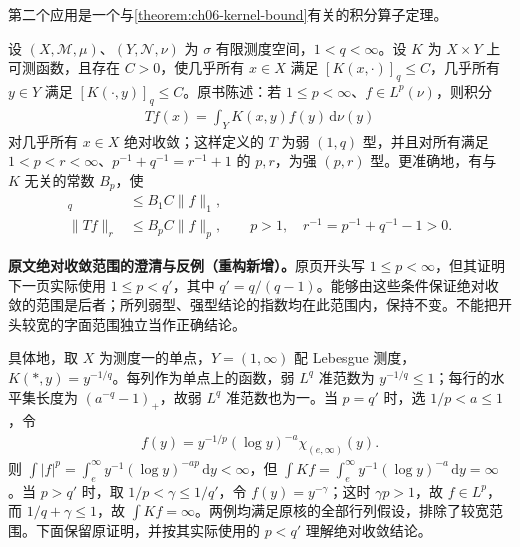 \documentclass[../../main.tex]{subfiles}
\begin{document}
第二个应用是一个与\cref{theorem:ch06-kernel-bound}有关的积分算子定理。
\begin{theorem}\label{theorem:ch06-weak-kernel}
设 $(X,\mathscr M,\mu)$、$(Y,\mathscr N,\nu)$ 为 $\sigma$ 有限测度空间，$1<q<\infty$。设 $K$ 为 $X\times Y$ 上可测函数，且存在 $C>0$，使几乎所有 $x\in X$ 满足 $[K(x,\cdot)]_q\leqslant C$，几乎所有 $y\in Y$ 满足 $[K(\cdot,y)]_q\leqslant C$。原书陈述：若 $1\leqslant p<\infty$、$f\in L^p(\nu)$，则积分
\begin{align*}
Tf(x)=\int_Y K(x,y)f(y)\,\mathrm d\nu(y)
\end{align*}
对几乎所有 $x\in X$ 绝对收敛；这样定义的 $T$ 为弱 $(1,q)$ 型，并且对所有满足 $1<p<r<\infty$、$p^{-1}+q^{-1}=r^{-1}+1$ 的 $p,r$，为强 $(p,r)$ 型。更准确地，有与 $K$ 无关的常数 $B_p$，使
\begin{align*}
[Tf]_q&\leqslant B_1C\|f\|_1,\\
\|Tf\|_r&\leqslant B_pC\|f\|_p,\qquad p>1,\quad r^{-1}=p^{-1}+q^{-1}-1>0.
\end{align*}
\end{theorem}
\begin{remark}
\textbf{原文绝对收敛范围的澄清与反例（重构新增）。}原页开头写 $1\leqslant p<\infty$，但其证明下一页实际使用 $1\leqslant p<q'$，其中 $q'=q/(q-1)$。能够由这些条件保证绝对收敛的范围是后者；所列弱型、强型结论的指数均在此范围内，保持不变。不能把开头较宽的字面范围独立当作正确结论。

具体地，取 $X$ 为测度一的单点，$Y=(1,\infty)$ 配 Lebesgue 测度，$K(*,y)=y^{-1/q}$。每列作为单点上的函数，弱 $L^q$ 准范数为 $y^{-1/q}\leqslant1$；每行的水平集长度为 $(a^{-q}-1)_+$，故弱 $L^q$ 准范数也为一。当 $p=q'$ 时，选 $1/p<a\leqslant1$，令
\begin{align*}
f(y)=y^{-1/p}(\log y)^{-a}\chi_{(e,\infty)}(y).
\end{align*}
则 $\int|f|^p=\int_e^\infty y^{-1}(\log y)^{-ap}\,\mathrm dy<\infty$，但
$\int Kf=\int_e^\infty y^{-1}(\log y)^{-a}\,\mathrm dy=\infty$。当 $p>q'$ 时，取 $1/p<\gamma\leqslant1/q'$，令 $f(y)=y^{-\gamma}$；这时 $\gamma p>1$，故 $f\in L^p$，而 $1/q+\gamma\leqslant1$，故 $\int Kf=\infty$。两例均满足原核的全部行列假设，排除了较宽范围。下面保留原证明，并按其实际使用的 $p<q'$ 理解绝对收敛结论。
\end{remark}
\end{document}
